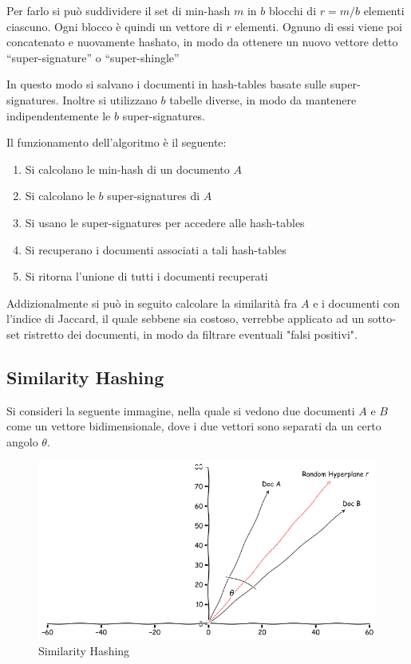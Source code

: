     Per farlo si può suddividere il set di min-hash $m$ in $b$ blocchi di $r=m/b$ elementi ciascuno. Ogni blocco è quindi un vettore di $r$ elementi. Ognuno di essi viene poi concatenato e nuovamente hashato, in modo da ottenere un nuovo vettore detto ``super-signature'' o ``super-shingle''

    In questo modo si salvano i documenti in hash-tables basate sulle super-signatures. Inoltre si utilizzano $b$ tabelle diverse, in modo da mantenere indipendentemente le $b$ super-signatures.

    Il funzionamento dell'algoritmo è il seguente:	
    \begin{enumerate}
      \item Si calcolano le min-hash di un documento $A$
      \item Si calcolano le $b$ super-signatures di $A$
      \item Si usano le super-signatures per accedere alle hash-tables
      \item Si recuperano i documenti associati a tali hash-tables
      \item Si ritorna l'unione di tutti i documenti recuperati
    \end{enumerate}

    Addizionalmente si può in seguito calcolare la similarità fra $A$ e i documenti con l'indice di Jaccard, il quale sebbene sia costoso, verrebbe applicato ad un sotto-set ristretto dei documenti, in modo da filtrare eventuali "falsi positivi".

    \clearpage

    \subsection{Similarity Hashing}
      Si consideri la seguente immagine, nella quale si vedono due documenti $A$ e $B$ come un vettore bidimensionale, dove i due vettori sono separati da un certo angolo $\theta$.

      \begin{figure}[h]
        \centering
        \includegraphics[width=1\textwidth]{images/sim-hash.png}
        \caption{Similarity Hashing}
      \end{figure}

